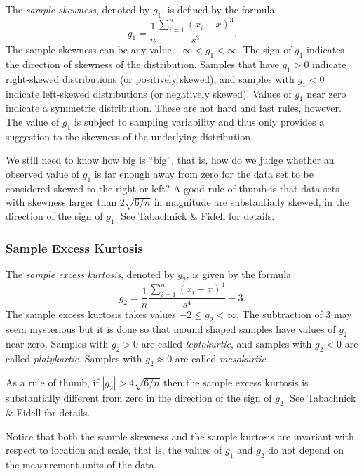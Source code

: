 \documentclass[captions=tableheading]{scrbook}
\begin{document}
The \emph{sample skewness}, denoted by \(g_{1}\), is defined by the formula
\begin{equation}
g_{1}=\frac{1}{n}\frac{\sum_{i=1}^{n}(x_{i}-\overline{x})^{3}}{s^{3}}.
\end{equation}
The sample skewness can be any value \(-\infty<g_{1}<\infty\). The sign of \(g_{1}\) indicates the direction of skewness of the distribution. Samples that have \(g_{1}>0\) indicate right-skewed distributions (or positively skewed), and samples with \(g_{1}<0\) indicate left-skewed distributions (or negatively skewed). Values of \(g_{1}\) near zero indicate a symmetric distribution. These are not hard and fast rules, however. The value of \(g_{1}\) is subject to sampling variability and thus only provides a suggestion to the skewness of the underlying distribution. 

We still need to know how big is ``big'', that is, how do we judge whether an observed value of \(g_{1}\) is far enough away from zero for the data set to be considered skewed to the right or left? A good rule of thumb is that data sets with skewness larger than \(2\sqrt{6/n}\) in magnitude are substantially skewed, in the direction of the sign of \(g_{1}\). See Tabachnick \& Fidell \cite{Tabachnick2006} for details.
\subsubsection{Sample Excess Kurtosis}
\label{sec-3-3-5-2}


The \emph{sample excess kurtosis}, denoted by \(g_{2}\), is given by the formula
\begin{equation}
g_{2}=\frac{1}{n}\frac{\sum_{i=1}^{n}(x_{i}-\overline{x})^{4}}{s^{4}}-3.
\end{equation}
The sample excess kurtosis takes values \(-2\leq g_{2}<\infty\). The subtraction of 3 may seem mysterious but it is done so that mound shaped samples have values of \(g_{2}\) near zero. Samples with \(g_{2}>0\) are called \emph{leptokurtic}, and samples with \(g_{2}<0\) are called \emph{platykurtic}. Samples with \(g_{2}\approx0\) are called \emph{mesokurtic}.

As a rule of thumb, if \(|g_{2}|>4\sqrt{6/n}\) then the sample excess kurtosis is substantially different from zero in the direction of the sign of \(g_{2}\). See Tabachnick \& Fidell \cite{Tabachnick2006} for details.

Notice that both the sample skewness and the sample kurtosis are invariant with respect to location and scale, that is, the values of \(g_{1}\) and \(g_{2}\) do not depend on the measurement units of the data. 
\end{document}
